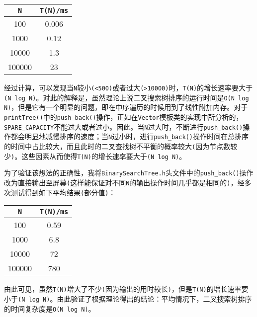 \documentclass[a4paper,12pt]{article}
\begin{document}
\begin{enumerate}
\begin{enumerate}
     \begin{center}
     \begin{tabular}{|c|c|}
     \hline
        \verb|N|  & \verb|T(N)/ms| \\
     \hline
     100  & 0.006 \\
     \hline
     1000 & 0.12 \\
     \hline
     10000 & 1.3 \\
     \hline
     100000 & 23 \\
     \hline
     \end{tabular}
     \end{center}

     经过计算，可以发现当\verb|N|较小\verb|(<500)|或者过大\verb|(>10000)|时，\verb|T(N)|的增长速率要大于\verb|(N log N)|。{\hei 对此的解释是}，虽然理论上说二叉搜索树排序的运行时间是\verb|O(N log N)|，但是它有一个明显的问题，即在中序遍历的时候用到了线性附加内存。对于\verb|printTree()|中的\verb|push_back()|操作，正如在\verb|Vector|模板类的实现中所分析的，
     \verb|SPARE_CAPACITY|不能过大或者过小。因此。当\verb|N|过大时，不断进行\verb|push_back()|操作都会明显地减慢排序的速度；当\verb|N|过小时，进行\verb|push_back()|操作时间在总排序的时间中占比较大，而且此时的二叉查找树不平衡的概率较大\verb|(|因为节点数较少\verb|)|。这些因素从而使得\verb|T(N)|的增长速率要大于\verb|(N log N)|。
     
     为了验证该想法的正确性，我将\verb|BinarySearchTree.h|头文件中的\verb|push_back()|操作改为直接输出至屏幕\verb|(|这样能保证对不同\verb|N|的输出操作时间几乎都是相同的\verb|)|，经多次测试得到如下平均结果\verb|(|部分值\verb|)|：

     \begin{center}
     \begin{tabular}{|c|c|}
     \hline
        \verb|N|  & \verb|T(N)/ms| \\
     \hline
     100  & 0.59 \\
     \hline
     1000 & 6.8 \\
     \hline
     10000 & 72 \\
     \hline
     100000 & 780 \\
     \hline
     \end{tabular}
     \end{center}
     
     由此可见，虽然\verb|T(N)|增大了不少\verb|(|因为输出的用时较长\verb|)|，但是\verb|T(N)|的增长速率要小于\verb|(N log N)|。由此验证了根据理论得出的结论：平均情况下，二叉搜索树排序的时间复杂度是\verb|O(N log N)|。

\end{enumerate}
\end{enumerate}



\end{document}
